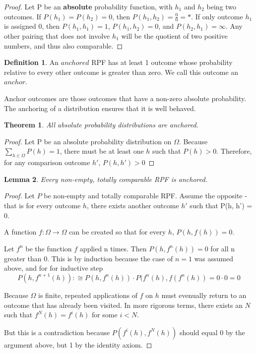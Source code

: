 \documentclass[twoside]{article}
\theoremstyle{plain}%
\newtheorem{theorem}{Theorem}[section]
\newtheorem{lemma}[theorem]{Lemma}
\theoremstyle{definition}
\newtheorem{definition}{Definition}[section]
\theoremstyle{remark}
\begin{document}
\begin{proof}
Let P be an \textbf{absolute} probability function, with \(h_1\) and \(h_2\) being two outcomes. If \(P(h_1) = P(h_2) = 0\), then \(P(h_1, h_2) = \frac{0}{0} = \ast\). If only outcome \(h_1\) is assigned 0, then \(P(h_1, h_1) = 1\), \(P(h_1, h_2) = 0\), and \(P(h_2, h_1) = \infty\). Any other pairing that does not involve \(h_1\) will be the quotient of two positive numbers, and thus also comparable.
\end{proof}

\begin{definition}
\label{def:anchored_rpf}
An \(anchored\) RPF has at least 1 outcome whose probability relative to every other outcome is greater than zero. We call this outcome an \(anchor\).
\end{definition}

Anchor outcomes are those outcomes that have a non-zero absolute probability. The anchoring of a distribution ensures that it is well behaved.

\begin{theorem}
\label{thm:absolute_anchored}
All absolute probability distributions are anchored.
\end{theorem}

\begin{proof}
Let P be an absolute probability distribution on \(\Omega\). Because \(\sum_{h \in \Omega} P(h) = 1\), there must be at least one \(h\) such that \(P(h) > 0\).  Therefore, for any comparison outcome \(h'\), \(P(h, h') > 0\)
\end{proof}

\begin{lemma}
\label{lemma:totally_comp_anchored}
Every non-empty, totally comparable RPF is anchored.
\end{lemma}

\begin{proof}
Let \(P\) be non-empty and totally comparable RPF. Assume the opposite - that is for every outcome \(h\), there exists another outcome \(h'\) such that P(h, h') = 0.

A function \(f: \Omega \rightarrow \Omega\) can be created so that for every \(h\), \(P(h, f(h)) = 0\).

Let \(f^n\) be the function \(f\) applied n times. Then \(P(h, f^n(h)) = 0\) for all n greater than 0. This is by induction because the case of \(n = 1\) was assumed above, and for for inductive step
\[P(h, f^{n+1}(h)) :\cong P(h, f^n(h)) \cdot P(f^n(h), f(f^n(h)) = 0 \cdot 0 = 0\]

Because \(\Omega\) is finite, repeated applications of \(f\) on \(h\) must evenually return to an outcome that has already been visited. In more rigorous terms, there exists an \(N\) such that \(f^N(h) = f^i(h)\) for some \(i < N\).

But this is a contradiction because \(P(f^i(h), f^N(h))\) should equal 0 by the argument above, but 1 by the identity axiom.
\end{proof}
\end{document}
